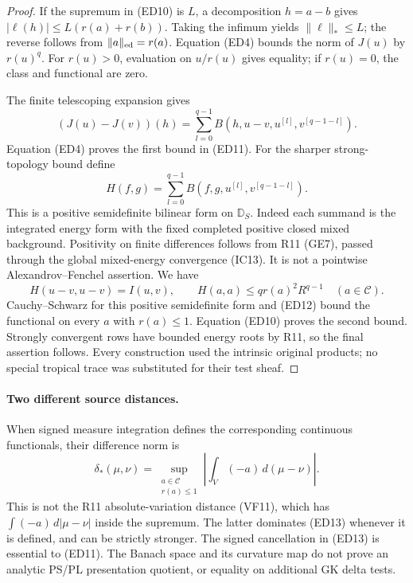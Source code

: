 \begin{proof}
If the supremum in (ED10) is $L$, a decomposition $h=a-b$
gives $|\ell(h)|\leq L(r(a)+r(b))$. Taking the infimum yields
$\|\ell\|_*\leq L$; the reverse follows from
$\|a\|_{\rm ed}=r(a)$. Equation (ED4) bounds the norm of
$J(u)$ by $r(u)^q$. For $r(u)>0$, evaluation on $u/r(u)$
gives equality; if $r(u)=0$, the class and functional are zero.

The finite telescoping expansion gives
\[
 (J(u)-J(v))(h)
    =\sum_{l=0}^{q-1}B(h,u-v,u^{[l]},v^{[q-1-l]}).
 \tag{ED12}
\]
Equation (ED4) proves the first bound in (ED11).
For the sharper strong-topology bound define
\[
 H(f,g)=\sum_{l=0}^{q-1}
                 B(f,g,u^{[l]},v^{[q-1-l]}).
\]
This is a positive semidefinite bilinear form on $\mathbb D_S$.
Indeed each summand is the integrated energy form with the
fixed completed positive closed mixed background. Positivity on
finite differences follows from R11 (GE7), passed through the
global mixed-energy convergence (IC13). It is not a pointwise
Alexandrov--Fenchel assertion. We have
\[
 H(u-v,u-v)=I(u,v),\qquad
 H(a,a)\leq q r(a)^2R^{q-1}\quad(a\in\mathscr C).
\]
Cauchy--Schwarz for this positive semidefinite form and (ED12)
bound the functional on every $a$ with $r(a)\leq1$.
Equation (ED10) proves the second bound. Strongly convergent
rows have bounded energy roots by R11, so the final assertion
follows. Every construction used the intrinsic original products;
no special tropical trace was substituted for their test sheaf.
\end{proof}

\paragraph{Two different source distances.}
When signed measure integration defines the corresponding continuous
functionals, their difference norm is
\[
 \delta_*(\mu,\nu)
     =\sup_{\substack{a\in\mathscr C\\r(a)\leq1}}
                    \left|\int_V(-a)\,d(\mu-\nu)\right|.
 \tag{ED13}
\]
This is not the R11 absolute-variation distance (VF11), which has
$\int(-a)\,d|\mu-\nu|$ inside the supremum. The latter dominates
(ED13) whenever it is defined, and can be strictly stronger.
The signed cancellation in (ED13) is essential to (ED11).
The Banach space and its curvature map do not prove an analytic
PS/PL presentation quotient, or equality on additional GK delta tests.
